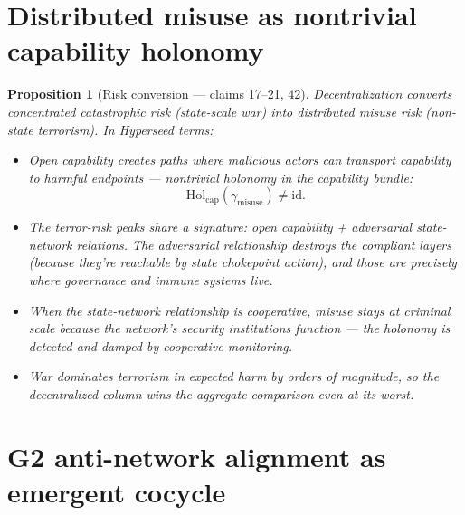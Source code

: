 \documentclass[11pt,a4paper]{article}
\newtheorem{proposition}[definition]{Proposition}
\begin{document}
\section{Distributed misuse as nontrivial capability holonomy}
\label{sec:misuse}

\begin{proposition}[Risk conversion --- claims 17--21, 42]
\label{prop:misuse}
Decentralization converts concentrated catastrophic risk (state-scale war)
into distributed misuse risk (non-state terrorism). In Hyperseed terms:
\begin{itemize}
\item Open capability creates paths where malicious actors can
  \emph{transport} capability to harmful endpoints --- nontrivial
  holonomy in the capability bundle:
  \[
    \text{Hol}_{\text{cap}}(\gamma_{\text{misuse}}) \neq \text{id}.
  \]
\item The terror-risk peaks share a signature: open capability +
  adversarial state-network relations. The adversarial relationship
  destroys the compliant layers (because they're reachable by state
  chokepoint action), and those are precisely where governance and
  immune systems live.
\item When the state-network relationship is cooperative, misuse
  stays at criminal scale because the network's security institutions
  function --- the holonomy is detected and damped by cooperative
  monitoring.
\item War dominates terrorism in expected harm by orders of magnitude,
  so the decentralized column wins the aggregate comparison even at
  its worst.
\end{itemize}
\end{proposition}

\section{G2 anti-network alignment as emergent cocycle}
\label{sec:g2}
\end{document}
